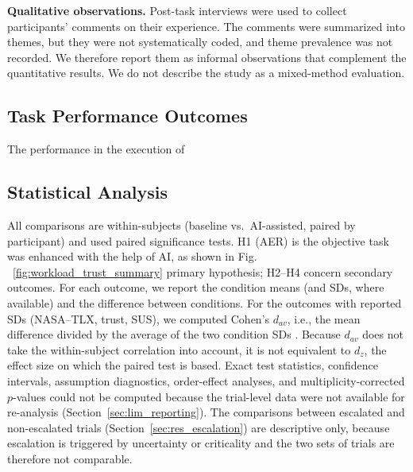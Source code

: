 \documentclass[journal]{IEEEtran}
\theoremstyle{plain}
\theoremstyle{definition}
\providecommand{\DIFaddtex}[1]{{\protect\color{blue} \sf #1}} %
\providecommand{\DIFdeltex}[1]{{\protect\color{red} \scriptsize #1}} %
\providecommand{\DIFaddbegin}{} %
\providecommand{\DIFaddend}{} %
\providecommand{\DIFdelbegin}{} %
\providecommand{\DIFdelend}{} %
\providecommand{\DIFadd}[1]{\texorpdfstring{\DIFaddtex{#1}}{#1}} %
\providecommand{\DIFdel}[1]{\texorpdfstring{\DIFdeltex{#1}}{}} %
\newcommand{\DIFscaledelfig}{0.5}
\newlength{\DIFdelgraphicswidth} %
\newlength{\DIFdelgraphicsheight} %
\newcommand{\DIFaddincludegraphics}[2][]{{\color{blue}\fbox{\DIFOincludegraphics[#1]{#2}}}} %
\newcommand{\DIFdelincludegraphics}[2][]{%
\sbox{\DIFdelgraphicsbox}{\DIFOincludegraphics[#1]{#2}}%
\settoboxwidth{\DIFdelgraphicswidth}{\DIFdelgraphicsbox} %
\settoboxtotalheight{\DIFdelgraphicsheight}{\DIFdelgraphicsbox} %
\scalebox{\DIFscaledelfig}{%
\parbox[b]{\DIFdelgraphicswidth}{\usebox{\DIFdelgraphicsbox}\\[-\baselineskip] \rule{\DIFdelgraphicswidth}{0em}}\llap{\resizebox{\DIFdelgraphicswidth}{\DIFdelgraphicsheight}{%
\setlength{\unitlength}{\DIFdelgraphicswidth}%
\begin{picture}(1,1)%
\thicklines\linethickness{2pt} %
{\color[rgb]{1,0,0}\put(0,0){\framebox(1,1){}}}%
{\color[rgb]{1,0,0}\put(0,0){\line( 1,1){1}}}%
{\color[rgb]{1,0,0}\put(0,1){\line(1,-1){1}}}%
\end{picture}%
}\hspace*{3pt}}} %
} %
\DeclareRobustCommand{\DIFaddbegin}{\DIFOaddbegin \let\includegraphics\DIFaddincludegraphics} %
\DeclareRobustCommand{\DIFaddend}{\DIFOaddend \let\includegraphics\DIFOincludegraphics} %
\DeclareRobustCommand{\DIFdelbegin}{\DIFOdelbegin \let\includegraphics\DIFdelincludegraphics} %
\DeclareRobustCommand{\DIFdelend}{\DIFOaddend \let\includegraphics\DIFOincludegraphics} %
\begin{document}
    \DIFdelbegin %
\DIFdelend \DIFaddbegin \DIFadd{\textbf{Qualitative observations.}
    Post-task interviews were used to collect participants' comments on their experience. The comments were summarized into themes, but they were not systematically coded, and theme prevalence was not recorded. We therefore report them as informal observations that complement the quantitative results. We do not describe the study as a mixed-method evaluation.
}\DIFaddend 

    \DIFdelbegin \subsection{\DIFdel{Task Performance Outcomes}}
\addtocounter{subsection}{-1}%

\DIFdel{The performance in the execution of }\DIFdelend \DIFaddbegin \subsection{\DIFadd{Statistical Analysis}}
    \DIFadd{All comparisons are within-subjects (baseline vs.\ AI-assisted, paired by participant) and used paired significance tests. H1 (AER) is }\DIFaddend the \DIFdelbegin \DIFdel{objective task was enhanced with the help of AI, as shown in Fig. ~\ref{fig:workload_trust_summary}}\DIFdelend \DIFaddbegin \DIFadd{primary hypothesis; H2--H4 concern secondary outcomes. For each outcome, we report the condition means (and SDs, where available) and the difference between conditions. For the outcomes with reported SDs (NASA--TLX, trust, SUS), we computed Cohen's $d_{av}$, i.e., the mean difference divided by the average of the two condition SDs \cite{Lakens2013}. Because $d_{av}$ does not take the within-subject correlation into account, it is not equivalent to $d_z$, the effect size on which the paired test is based. Exact test statistics, confidence intervals, assumption diagnostics, order-effect analyses, and multiplicity-corrected $p$-values could not be computed because the trial-level data were not available for re-analysis (Section~\ref{sec:lim_reporting}). The comparisons between escalated and non-escalated trials (Section~\ref{sec:res_escalation}) are descriptive only, because escalation is triggered by uncertainty or criticality and the two sets of trials are therefore not comparable.
}
\end{document}
